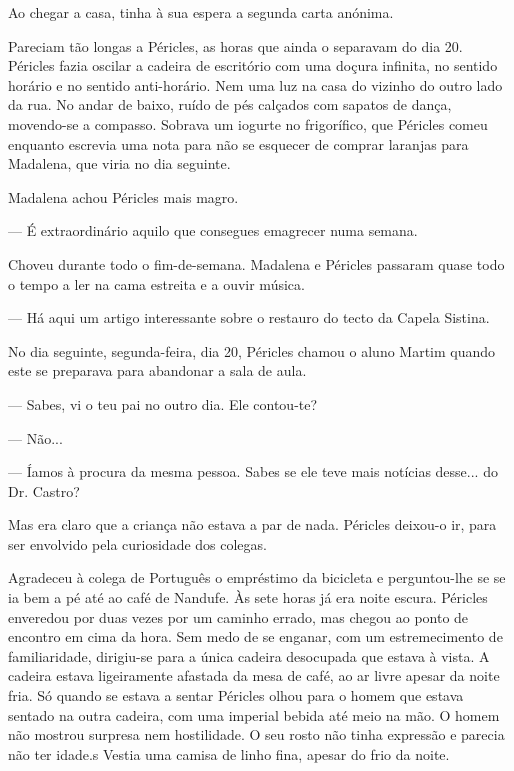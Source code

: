 Ao chegar a casa, tinha à sua espera a segunda carta anónima.

\begin{quotation}
\end{quotation}

Pareciam tão longas a Péricles, as horas que ainda o separavam do dia
20. Péricles fazia oscilar a cadeira de escritório com uma doçura
infinita, no sentido horário e no sentido anti-horário. Nem uma luz na casa do vizinho do outro lado da rua. No andar
de baixo, ruído de pés calçados com sapatos de dança, movendo-se a
compasso. Sobrava um iogurte no frigorífico, que Péricles comeu
enquanto escrevia uma nota para não se esquecer de comprar laranjas para
Madalena, que viria no dia seguinte.

Madalena achou Péricles mais magro.

--- É extraordinário aquilo que consegues emagrecer numa semana.


Choveu durante todo o fim-de-semana. Madalena e Péricles passaram quase
todo o tempo a ler na cama estreita e a ouvir música.

--- Há aqui um artigo interessante sobre o restauro do tecto da Capela Sistina.


No dia seguinte, segunda-feira, dia 20, Péricles chamou o aluno Martim
quando este se preparava para abandonar a sala de aula.

--- Sabes, vi o teu pai no outro dia. Ele contou-te?

--- Não...

--- Íamos à procura da mesma pessoa. Sabes se ele teve mais notícias
desse... do Dr. Castro?

Mas era claro que a criança não estava a par de nada. Péricles deixou-o
ir, para ser envolvido pela curiosidade dos colegas.

Agradeceu à colega de Português o empréstimo da bicicleta e
perguntou-lhe se se ia bem a pé até ao café de Nandufe. Às sete horas já
era noite escura. Péricles enveredou por duas vezes por um caminho
errado, mas chegou ao ponto de encontro em cima da hora. Sem medo de se
enganar, com um estremecimento de familiaridade, dirigiu-se para a única
cadeira desocupada que estava à vista. A cadeira estava ligeiramente
afastada da mesa de café, ao ar livre apesar da noite fria. Só quando se
estava a sentar Péricles olhou para o homem que estava sentado na outra
cadeira, com uma imperial bebida até meio na mão. O homem não mostrou
surpresa nem hostilidade. O seu rosto não tinha expressão e parecia
não ter idade.s
Vestia uma camisa de linho fina, apesar do frio da noite.

